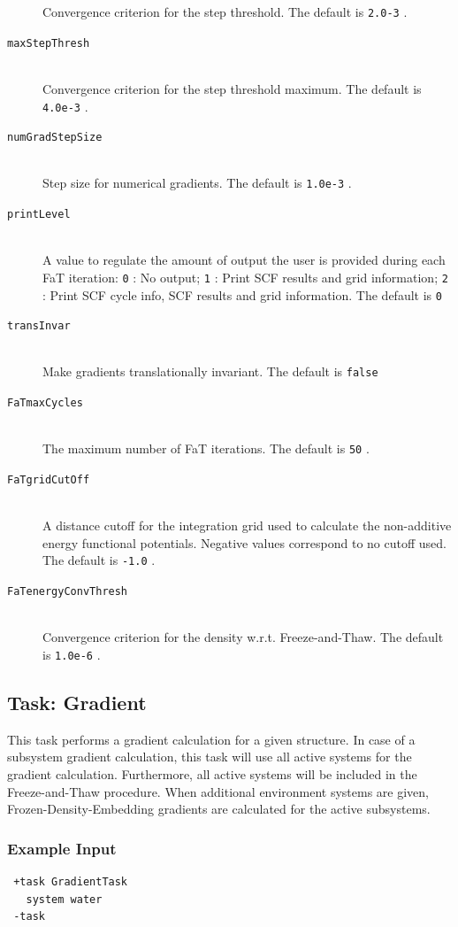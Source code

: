 \documentclass[bibliography=totocnumbered,a4paper,10pt,oneside]{scrbook}
\newcommand{\ttt}[1]{%
  \begingroup\setlength{\fboxsep}{1pt}%
  \colorbox{serenity-green!30}{\texttt{\hspace*{2pt}\vphantom{(g}#1\hspace*{2pt}}}%
  \endgroup
}
\begin{document}
\begin{description}
  Convergence criterion for the step threshold. The default is \ttt{2.0-3}. 
 \item [\texttt{maxStepThresh}]\hfill \\
  Convergence criterion for the step threshold maximum. The default is \ttt{4.0e-3}. 
 \item [\texttt{numGradStepSize}]\hfill \\
  Step size for numerical gradients. The default is \ttt{1.0e-3}. 
 \item [\texttt{printLevel}]\hfill \\
  A value to regulate the amount of output the user is provided during each FaT iteration:
  \ttt{0}: No output; \ttt{1}: Print SCF results and grid information; \ttt{2}: Print SCF cycle info, SCF results and grid information. The default is \ttt{0}
 \item [\texttt{transInvar}]\hfill \\
    Make gradients translationally invariant. The default is \ttt{false}
 \item [\texttt{FaTmaxCycles}]\hfill \\
   The maximum number of FaT iterations. The default is \ttt{50}.
 \item [\texttt{FaTgridCutOff}]\hfill \\
  A distance cutoff for the integration grid used to calculate the non-additive energy functional potentials. Negative values correspond to no cutoff used. The default is \ttt{-1.0}.
 \item [\texttt{FaTenergyConvThresh}]\hfill \\
 Convergence criterion for the density w.r.t. Freeze-and-Thaw. The default is \ttt{1.0e-6}.
\end{description}


\subsection{Task: Gradient}
This task performs a gradient calculation for a given structure. In case of a subsystem gradient calculation, this task will use all active systems for the gradient calculation. Furthermore, all active systems will be included in the Freeze-and-Thaw procedure. When additional environment systems are given, Frozen-Density-Embedding gradients are calculated for the active subsystems.
\subsubsection{Example Input}
\begin{lstlisting}
 +task GradientTask
   system water
 -task
\end{lstlisting}
\end{document}
